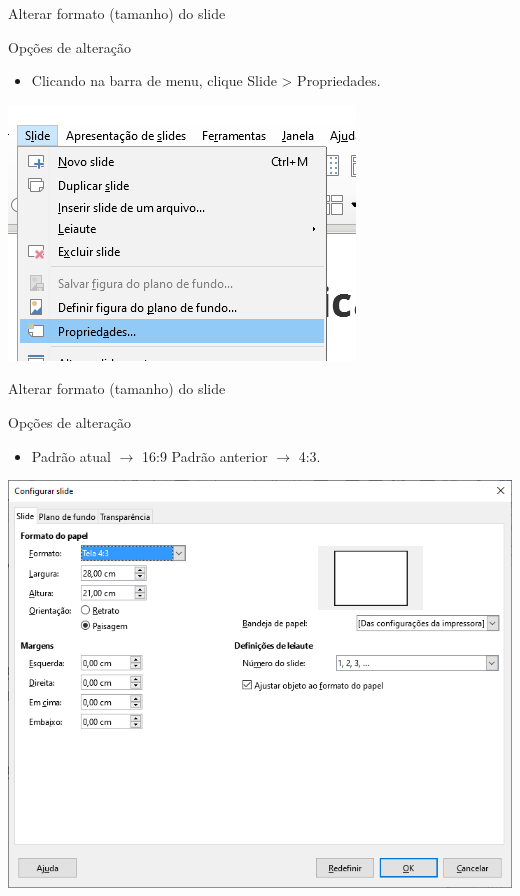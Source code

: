 \begin{frame}{Alterar formato (tamanho) do slide}
	\begin{block}{Opções de alteração}
		\begin{itemize}
			\item Clicando na barra de menu, clique Slide > Propriedades.
		\end{itemize}
	\end{block}

	\centering
	\includegraphics[width=0.7\linewidth]{Figuras/Ch05/fig16.2}
\end{frame}


\begin{frame}{Alterar formato (tamanho) do slide}
	\begin{block}{Opções de alteração}
		\begin{itemize}
			\item Padrão atual $ \to $ 16:9 Padrão anterior $ \to $ 4:3.
		\end{itemize}
	\end{block}

	\centering
	\includegraphics[width=0.65\linewidth]{Figuras/Ch05/fig16.3}
\end{frame}


